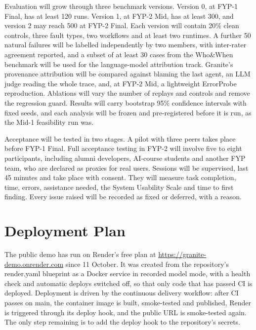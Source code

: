 \documentclass{fast-nuces-bs}
\begin{document}
Evaluation will grow through three benchmark versions. Version 0, at FYP-1 Final, has at least 120 runs. Version 1, at FYP-2 Mid, has at least 300, and version 2 may reach 500 at FYP-2 Final. Each version will contain 20\% clean controls, three fault types, two workflows and at least two runtimes. A further 50 natural failures will be labelled independently by two members, with inter-rater agreement reported, and a subset of at least 30 cases from the Who\&When benchmark will be used for the language-model attribution track. Granite's provenance attribution will be compared against blaming the last agent, an LLM judge reading the whole trace, and, at FYP-2 Mid, a lightweight ErrorProbe reproduction. Ablations will vary the number of replays and controls and remove the regression guard. Results will carry bootstrap 95\% confidence intervals with fixed seeds, and each analysis will be frozen and pre-registered before it is run, as the Mid-1 feasibility run was.

Acceptance will be tested in two stages. A pilot with three peers takes place before FYP-1 Final. Full acceptance testing in FYP-2 will involve five to eight participants, including alumni developers, AI-course students and another FYP team, who are declared as proxies for real users. Sessions will be supervised, last 45 minutes and take place with consent. They will measure task completion, time, errors, assistance needed, the System Usability Scale and time to first finding. Every issue raised will be recorded as fixed or deferred, with a reason.

\section{Deployment Plan}

The public demo has run on Render's free plan at \url{https://granite-demo.onrender.com} since 11 October. It was created from the repository's render.yaml blueprint as a Docker service in recorded model mode, with a health check and automatic deploys switched off, so that only code that has passed CI is deployed. Deployment is driven by the continuous delivery workflow: after CI passes on main, the container image is built, smoke-tested and published, Render is triggered through its deploy hook, and the public URL is smoke-tested again. The only step remaining is to add the deploy hook to the repository's secrets.
\end{document}

